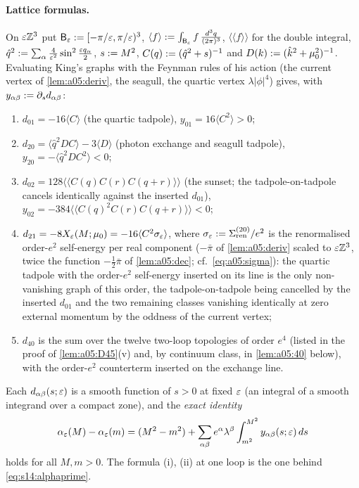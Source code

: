 \paragraph{Lattice formulas.} On $\varepsilon\mathbb Z^3$ put $\mathsf B_{\varepsilon}:=[-\pi/\varepsilon,\pi/\varepsilon)^3$, $\langle f\rangle:=\int_{\mathsf B_{\varepsilon}}f\,\frac{d^3q}{(2\pi)^3}$, $\langle\langle f\rangle\rangle$ for the double integral, $\hat q^2:=\sum_\alpha\frac4{\varepsilon^2}\sin^2\frac{\varepsilon q_\alpha}2$, $s:= M^2$, $C(q):=(\hat q^2+s)^{-1}$ and $D(k):=(\hat k^2+\mu_0^2)^{-1}$. Evaluating King's graphs \cite[(3.34)]{K1} with the Feynman rules of his action (the current vertex of \cref{lem:a05:deriv}, the seagull, the quartic vertex $\lambda|\phi|^4$) gives, with $y_{\alpha\beta}:=\partial_sd_{\alpha\beta}$:
\begin{enumerate}[label=\textup{(\roman*)},nosep,leftmargin=*]
\item $d_{01}=-16\langle C\rangle$ (the quartic tadpole), $y_{01}=16\langle C^2\rangle>0$;
\item $d_{20}=\langle\hat q^2DC\rangle-3\langle D\rangle$ (photon exchange and seagull tadpole), $y_{20}=-\langle\hat q^2DC^2\rangle<0$;
\item $d_{02}=128\langle\langle C(q)C(r)C(q+r)\rangle\rangle$ (the sunset; the tadpole-on-tadpole cancels identically against the inserted $d_{01}$), $y_{02}=-384\langle\langle C(q)^2C(r)C(q+r)\rangle\rangle<0$;
\item $d_{21}=-8X_{\varepsilon}(M;\mu_0)=-16\langle C^2\sigma_{\varepsilon}\rangle$, where $\sigma_{\varepsilon}:=\Sigma^{(20)}_{\rm ren}/e^2$ is the renormalised order-$e^2$ self-energy per real component ($-\bar\pi$ of \cref{lem:a05:deriv} scaled to $\varepsilon\mathbb Z^3$, twice the function $-\frac12\bar\pi$ of \cref{lem:a05:dec}; cf.\ \eqref{eq:a05:sigma}): the quartic tadpole with the order-$e^2$ self-energy inserted on its line is the only non-vanishing graph of this order, the tadpole-on-tadpole being cancelled by the inserted $d_{01}$ and the two remaining classes vanishing identically at zero external momentum by the oddness of the current vertex;
\item $d_{40}$ is the sum over the twelve two-loop topologies of order $e^4$ (listed in the proof of \cref{lem:a05:D45}(v) and, by continuum class, in \cref{lem:a05:40} below), with the order-$e^2$ counterterm inserted on the exchange line.
\end{enumerate}
Each $d_{\alpha\beta}(s;\varepsilon)$ is a smooth function of $s>0$ at fixed $\varepsilon$ (an integral of a smooth integrand over a compact zone), and the \emph{exact identity}
\begin{equation}\label{eq:a05:exact}
\alpha_{\varepsilon}(M)-\alpha_{\varepsilon}(m)=(M^2-m^2)+\sum_{\alpha\beta}e^\alpha\lambda^\beta\int_{m^2}^{M^2}y_{\alpha\beta}(s;\varepsilon)\,ds
\end{equation}
holds for all $M,m>0$. The formula (i), (ii) at one loop is the one behind \eqref{eq:s14:alphaprime}.


